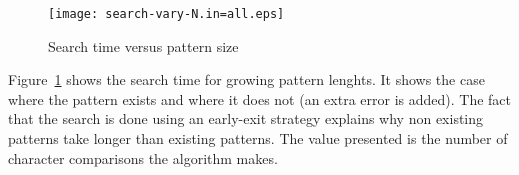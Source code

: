 \begin{figure}
\centering
\texttt{[image: search-vary-N.in=all.eps]}
\caption{Search time versus pattern size}\label{fig:search-vary-m}
\end{figure}

Figure~\ref{fig:search-vary-m} shows the search time for growing pattern lenghts. It shows the case where the pattern exists and where it does not (an extra error is added). The fact that the search is done using an early-exit strategy explains why non existing patterns take longer than existing patterns. The value presented is the number of character comparisons the algorithm makes.
